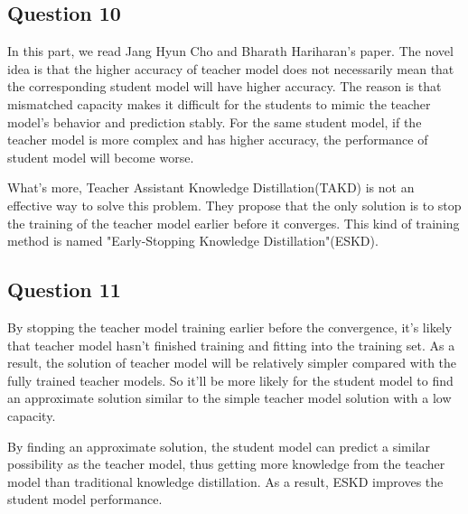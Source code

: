\documentclass[conference]{IEEEtran}
\begin{document}
  \subsection{Question 10}
  In this part, we read Jang Hyun Cho and Bharath Hariharan's\cite{b2} paper. The novel idea is that the higher accuracy of teacher model does not necessarily mean that the corresponding student model will have higher accuracy. The reason is that mismatched capacity makes it difficult for the students to mimic the teacher model's behavior and prediction stably. For the same student model, if the teacher model is more complex and has higher accuracy, the performance of student model will become worse.\par
  What's more, Teacher Assistant Knowledge Distillation(TAKD) is not an effective way to solve this problem. They propose that the only solution is to stop the training of the teacher model earlier before it converges. This kind of training method is named "Early-Stopping Knowledge Distillation"(ESKD).
  
  \subsection{Question 11}
  By stopping the teacher model training earlier before the convergence, it's likely that teacher model hasn't finished training and fitting into the training set. As a result, the solution of teacher model will be relatively simpler compared with the fully trained teacher models. So it'll be more likely for the student model to find an approximate solution similar to the simple teacher model solution with a low capacity.\par
  By finding an approximate solution, the student model can predict a similar possibility as the teacher model, thus getting more knowledge from the teacher model than traditional knowledge distillation.
  As a result, ESKD improves the student model performance.
\end{document}
